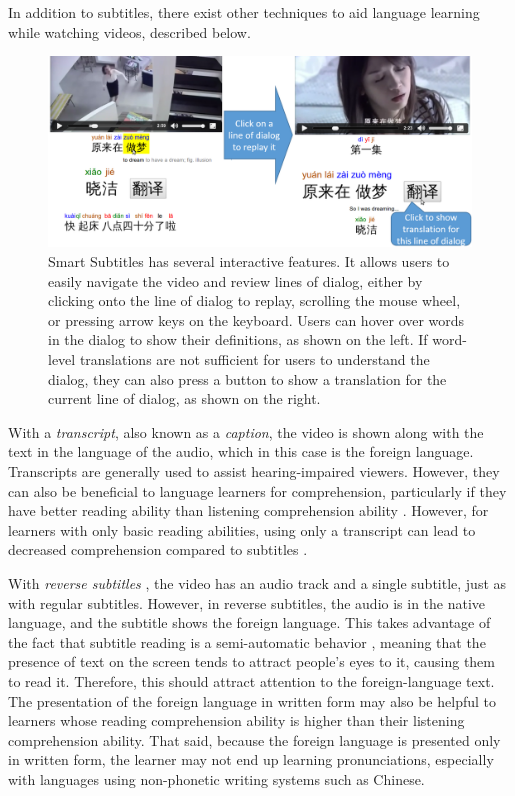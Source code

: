 \documentclass{sigchi}
\begin{document}
In addition to subtitles, there exist other techniques to aid language learning
while watching videos, described below.

\begin{figure}[bp]
\centering
\includegraphics[width=2\columnwidth]{seekdialog-horizontal-translate-cropped2}
\caption{Smart Subtitles has several interactive features. It allows users to easily navigate the video and
review lines of dialog, either by clicking onto the line of dialog to replay,
scrolling the mouse wheel,
or pressing arrow keys on the keyboard. Users can hover over words
in the dialog to show their definitions, as shown on the left.
If word-level translations are not sufficient for users to understand the dialog, they can also press a button to show a translation for the current
line of dialog, as shown on the right.}
\label{fig:figure25}
\end{figure}

With a \emph{transcript}, also known as a \emph{caption}, the video is shown along with the text in the
language of the audio, which in this case is the foreign language. Transcripts are generally used to
assist hearing-impaired viewers. However, they can also be beneficial to language learners for
comprehension, particularly if they have better reading ability than
listening comprehension ability \cite{danan2004captioning}. However,
for learners with only basic reading abilities,
using only a transcript can lead to decreased comprehension compared to subtitles \cite{bianchi2008captions}.



With \emph{reverse subtitles} \cite{danan1992reversed}, the video has an audio track and a single subtitle, just as with regular
subtitles. However, in reverse subtitles, the audio is in the native language, and
the subtitle shows the foreign language. This takes advantage of the fact that subtitle reading is
a semi-automatic behavior \cite{d2002foreign}, meaning that the presence of text on the screen tends to attract
people's eyes to it, causing them to read it. Therefore, this should attract attention to the foreign-language text. The presentation of the foreign language in written form may also be helpful to learners whose reading comprehension ability is higher than their listening comprehension ability. That said, because the foreign language is presented only in written form, the
learner may not end up learning pronunciations, especially with languages using non-phonetic writing systems such as Chinese.
\end{document}

